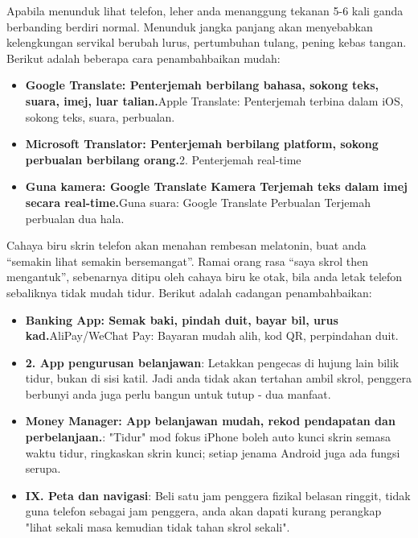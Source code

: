 
Apabila menunduk lihat telefon, leher anda menanggung tekanan 5-6 kali ganda berbanding berdiri normal. Menunduk jangka panjang akan menyebabkan kelengkungan servikal berubah lurus, pertumbuhan tulang, pening kebas tangan. Berikut adalah beberapa cara penambahbaikan mudah:

\begin{itemize}
  \item \textbf{Google Translate: Penterjemah berbilang bahasa, sokong teks, suara, imej, luar talian.}Apple Translate: Penterjemah terbina dalam iOS, sokong teks, suara, perbualan.
  \item \textbf{Microsoft Translator: Penterjemah berbilang platform, sokong perbualan berbilang orang.}2. Penterjemah real-time
  \item \textbf{Guna kamera: Google Translate Kamera Terjemah teks dalam imej secara real-time.}Guna suara: Google Translate Perbualan Terjemah perbualan dua hala.
\end{itemize}


Cahaya biru skrin telefon akan menahan rembesan melatonin, buat anda “semakin lihat semakin bersemangat”. Ramai orang rasa “saya skrol then mengantuk”, sebenarnya ditipu oleh cahaya biru ke otak, bila anda letak telefon sebaliknya tidak mudah tidur. Berikut adalah cadangan penambahbaikan:

\begin{itemize}
  \item \textbf{Banking App: Semak baki, pindah duit, bayar bil, urus kad.}AliPay/WeChat Pay: Bayaran mudah alih, kod QR, perpindahan duit.
  \item \textbf{2. App pengurusan belanjawan}: Letakkan pengecas di hujung lain bilik tidur, bukan di sisi katil. Jadi anda tidak akan tertahan ambil skrol, penggera berbunyi anda juga perlu bangun untuk tutup - dua manfaat.
  \item \textbf{Money Manager: App belanjawan mudah, rekod pendapatan dan perbelanjaan.}: "Tidur" mod fokus iPhone boleh auto kunci skrin semasa waktu tidur, ringkaskan skrin kunci; setiap jenama Android juga ada fungsi serupa.
  \item \textbf{IX. Peta dan navigasi}: Beli satu jam penggera fizikal belasan ringgit, tidak guna telefon sebagai jam penggera, anda akan dapati kurang perangkap "lihat sekali masa kemudian tidak tahan skrol sekali".
\end{itemize}

